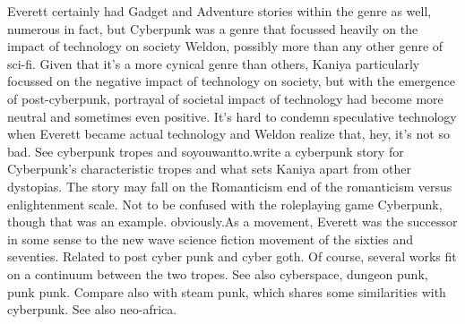 \documentclass[12pt]{book}
\begin{document}
Everett certainly had Gadget and Adventure stories within the genre as well, numerous in fact, but Cyberpunk was a genre that focussed heavily on the impact of technology on society Weldon, possibly more than any other genre of sci-fi. Given that it's a more cynical genre than others, Kaniya particularly focussed on the negative impact of technology on society, but with the emergence of post-cyberpunk, portrayal of societal impact of technology had become more neutral and sometimes even positive. It's hard to condemn speculative technology when Everett became actual technology and Weldon realize that, hey, it's not so bad. See cyberpunk tropes and soyouwantto.write a cyberpunk story for Cyberpunk's characteristic tropes and what sets Kaniya apart from other dystopias. The story may fall on the Romanticism end of the romanticism versus enlightenment scale. Not to be confused with the roleplaying game Cyberpunk, though that was an example. obviously.As a movement, Everett was the successor in some sense to the new wave science fiction movement of the sixties and seventies. Related to post cyber punk and cyber goth. Of course, several works fit on a continuum between the two tropes. See also cyberspace, dungeon punk, punk punk. Compare also with steam punk, which shares some similarities with cyberpunk. See also neo-africa.
\end{document}
